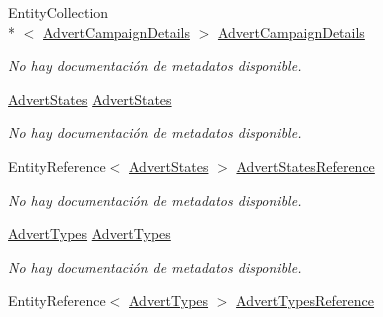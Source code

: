 \begin{DoxyCompactItemize}
Entity\-Collection\\*
$<$ \hyperlink{class_microsoft_1_1_samples_1_1_kinect_1_1_basic_interactions_1_1_advert_campaign_details}{Advert\-Campaign\-Details} $>$ \hyperlink{class_microsoft_1_1_samples_1_1_kinect_1_1_basic_interactions_1_1_adverts_a387e66aa0c999c29a316b2ae24d773e0}{Advert\-Campaign\-Details}
\begin{DoxyCompactList}\small\item\em No hay documentación de metadatos disponible. \end{DoxyCompactList}\item 
\hyperlink{class_microsoft_1_1_samples_1_1_kinect_1_1_basic_interactions_1_1_advert_states}{Advert\-States} \hyperlink{class_microsoft_1_1_samples_1_1_kinect_1_1_basic_interactions_1_1_adverts_a0f87d9f958ab0de5900801b8c4d3074d}{Advert\-States}
\begin{DoxyCompactList}\small\item\em No hay documentación de metadatos disponible. \end{DoxyCompactList}\item 
Entity\-Reference$<$ \hyperlink{class_microsoft_1_1_samples_1_1_kinect_1_1_basic_interactions_1_1_advert_states}{Advert\-States} $>$ \hyperlink{class_microsoft_1_1_samples_1_1_kinect_1_1_basic_interactions_1_1_adverts_acfcea45623a4a118a9da65b829f2510f}{Advert\-States\-Reference}
\begin{DoxyCompactList}\small\item\em No hay documentación de metadatos disponible. \end{DoxyCompactList}\item 
\hyperlink{class_microsoft_1_1_samples_1_1_kinect_1_1_basic_interactions_1_1_advert_types}{Advert\-Types} \hyperlink{class_microsoft_1_1_samples_1_1_kinect_1_1_basic_interactions_1_1_adverts_aef91c404c71c94f213d34b8099dba102}{Advert\-Types}
\begin{DoxyCompactList}\small\item\em No hay documentación de metadatos disponible. \end{DoxyCompactList}\item 
Entity\-Reference$<$ \hyperlink{class_microsoft_1_1_samples_1_1_kinect_1_1_basic_interactions_1_1_advert_types}{Advert\-Types} $>$ \hyperlink{class_microsoft_1_1_samples_1_1_kinect_1_1_basic_interactions_1_1_adverts_a025e83eea34d835ee1b1996e2829b62c}{Advert\-Types\-Reference}

\end{DoxyCompactItemize}
